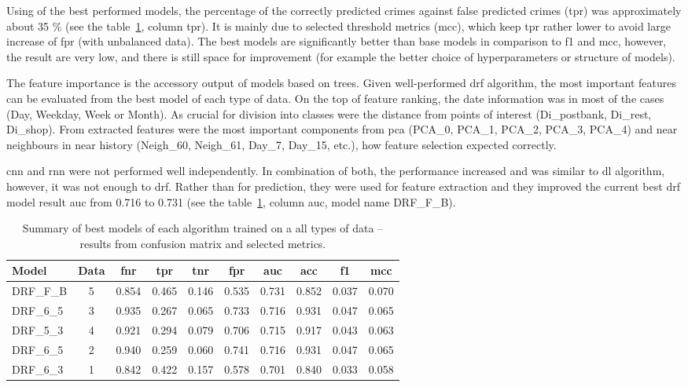 \documentclass[thesis=M,english]{FITthesis}[2012/10/20]
\begin{document}
Using of the best performed models, the percentage of the correctly predicted crimes against false predicted crimes (\gls{tpr}) was approximately about 35 \% (see the table~\ref{tab:all_data_summary}, column \gls{tpr}). It is mainly due to selected threshold metrics (\gls{mcc}), which keep \gls{tpr} rather lower to avoid large increase of \gls{fpr} (with unbalanced data). The best models are significantly better than base models in comparison to \gls{f1} and \gls{mcc}, however, the result are very low, and there is still space for improvement (for example the better choice of hyperparameters or structure of models). 

The feature importance is the accessory output of models based on trees. Given well-performed \gls{drf} algorithm, the most important features can be evaluated from the best model of each type of data. On the top of feature ranking, the date information was in most of the cases (Day, Weekday, Week or Month). As crucial for division into classes were the distance from points of interest (Di\_postbank, Di\_rest, Di\_shop). From extracted features were the most important components from \gls{pca} (PCA\_0, PCA\_1, PCA\_2, PCA\_3, PCA\_4) and near neighbours in near history (Neigh\_60, Neigh\_61, Day\_7, Day\_15, etc.), how feature selection expected correctly. 

\gls{cnn} and \gls{rnn} were not performed well independently. In combination of both, the performance increased and was similar to \gls{dl} algorithm, however, it was not enough to \gls{drf}. Rather than for prediction, they were used for feature extraction and they improved the current best \gls{drf} model result \gls{auc} from 0.716 to 0.731 (see the table~\ref{tab:all_data_summary}, column \gls{auc}, model name DRF\_F\_B).

\begin{table}[H]\centering
\begin{scriptsize}
    \caption{Summary of best models of each algorithm trained on a all types of data -- results from confusion matrix and selected metrics.}\label{tab:all_data_summary}
    \begin{tabular}{|l|c|c|c|c|c|c|c|c|c|}\hline
        Model & Data & \gls{fnr} & \gls{tpr} & \gls{tnr} & \gls{fpr} & \gls{auc} & \gls{acc} & \gls{f1} & \gls{mcc} \tabularnewline \hline \hline
        DRF\_F\_B & 5 & 0.854 & 0.465 & 0.146 & 0.535 & 0.731 & 0.852 & 0.037 & 0.070 \tabularnewline  \hline
        DRF\_6\_5 & 3 & 0.935 & 0.267 & 0.065 & 0.733 & 0.716 & 0.931 & 0.047 & 0.065 \tabularnewline \hline
        DRF\_5\_3 & 4 & 0.921 & 0.294 & 0.079 & 0.706 & 0.715 & 0.917 & 0.043 & 0.063 \tabularnewline \hline
        DRF\_6\_5 & 2 & 0.940 & 0.259 & 0.060 & 0.741 & 0.716 & 0.931 & 0.047 & 0.065 \tabularnewline \hline
        DRF\_6\_3 & 1 & 0.842 & 0.422 & 0.157 & 0.578 & 0.701 & 0.840 & 0.033 & 0.058 \tabularnewline \hline
    \end{tabular}
\end{scriptsize}
\end{table}
\end{document}
